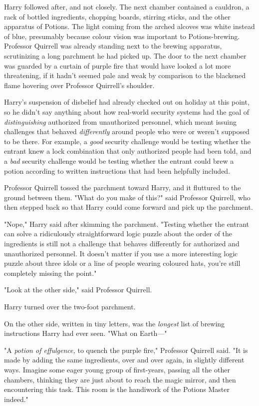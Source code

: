 Harry followed after, and not closely.
\later
The next chamber contained a cauldron, a rack of bottled ingredients, chopping
boards, stirring sticks, and the other apparatus of Potions. The light coming
from the arched alcoves was white instead of blue, presumably because colour
vision was important to Potions-brewing. Professor Quirrell was already
standing next to the brewing apparatus, scrutinizing a long parchment he had
picked up. The door to the next chamber was guarded by a curtain of purple fire
that would have looked a lot more threatening, if it hadn't seemed pale and
weak by comparison to the blackened flame hovering over Professor Quirrell's
shoulder.

Harry's suspension of disbelief had already checked out on holiday at this
point, so he didn't say anything about how real-world security systems had the
goal of \emph{distinguishing} authorized from unauthorized personnel, which
meant issuing challenges that behaved \emph{differently} around people who were
or weren't supposed to be there. For example, a \emph{good} security challenge
would be testing whether the entrant knew a lock combination that only
authorized people had been told, and a \emph{bad} security challenge would be
testing whether the entrant could brew a potion according to written
instructions that had been helpfully included.

Professor Quirrell tossed the parchment toward Harry, and it fluttured to the
ground between them. "What do you make of this?" said Professor Quirrell, who
then stepped back so that Harry could come forward and pick up the parchment.

"Nope," Harry said after skimming the parchment. "Testing whether the entrant
can solve a ridiculously straightforward logic puzzle about the order of the
ingredients is still not a challenge that behaves differently for authorized
and unauthorized personnel. It doesn't matter if you use a more interesting
logic puzzle about three idols or a line of people wearing coloured hats, you're
still completely missing the point."

"Look at the other side," said Professor Quirrell.

Harry turned over the two-foot parchment.

On the other side, written in tiny letters, was the \emph{longest} list of
brewing instructions Harry had ever seen. "What on Earth---"

"A \emph{potion of effulgence,} to quench the purple fire," Professor Quirrell
said. "It is made by adding the same ingredients, over and over again, in
slightly different ways. Imagine some eager young group of first-years, passing
all the other chambers, thinking they are just about to reach the magic mirror,
and then encountering this task. This room is the handiwork of the Potions
Master indeed."

